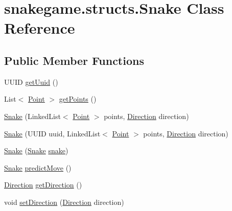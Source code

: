 \hypertarget{classsnakegame_1_1structs_1_1_snake}{}\section{snakegame.\+structs.\+Snake Class Reference}
\label{classsnakegame_1_1structs_1_1_snake}
\subsection*{Public Member Functions}
\begin{DoxyCompactItemize}
\item 
U\+U\+ID \mbox{\hyperlink{classsnakegame_1_1structs_1_1_snake_ac17bff959740ffec977a37b6ed905a0c}{get\+Uuid}} ()
\item 
List$<$ \mbox{\hyperlink{classsnakegame_1_1structs_1_1_point}{Point}} $>$ \mbox{\hyperlink{classsnakegame_1_1structs_1_1_snake_a1201fceabdd51b2cbb3fdd69f151fec9}{get\+Points}} ()
\item 
\mbox{\hyperlink{classsnakegame_1_1structs_1_1_snake_ae76efb0ea42951d99b3f3e3134622120}{Snake}} (Linked\+List$<$ \mbox{\hyperlink{classsnakegame_1_1structs_1_1_point}{Point}} $>$ points, \mbox{\hyperlink{enumsnakegame_1_1structs_1_1_direction}{Direction}} direction)
\item 
\mbox{\hyperlink{classsnakegame_1_1structs_1_1_snake_afae60310456b2ff1474879d2c80d75b1}{Snake}} (U\+U\+ID uuid, Linked\+List$<$ \mbox{\hyperlink{classsnakegame_1_1structs_1_1_point}{Point}} $>$ points, \mbox{\hyperlink{enumsnakegame_1_1structs_1_1_direction}{Direction}} direction)
\item 
\mbox{\hyperlink{classsnakegame_1_1structs_1_1_snake_a4d2bf8212dfe91b17aed31f44203f37f}{Snake}} (\mbox{\hyperlink{classsnakegame_1_1structs_1_1_snake}{Snake}} \mbox{\hyperlink{classsnakegame_1_1snake}{snake}})
\item 
\mbox{\hyperlink{classsnakegame_1_1structs_1_1_snake}{Snake}} \mbox{\hyperlink{classsnakegame_1_1structs_1_1_snake_a0e8e4b28dd22705782f7a985e17b364d}{predict\+Move}} ()
\item 
\mbox{\hyperlink{enumsnakegame_1_1structs_1_1_direction}{Direction}} \mbox{\hyperlink{classsnakegame_1_1structs_1_1_snake_a596ece3775ed531cef2fc023f339052e}{get\+Direction}} ()
\item 
void \mbox{\hyperlink{classsnakegame_1_1structs_1_1_snake_abcd015387736c76d4c6770cb7d33f59c}{set\+Direction}} (\mbox{\hyperlink{enumsnakegame_1_1structs_1_1_direction}{Direction}} direction)

\end{DoxyCompactItemize}
